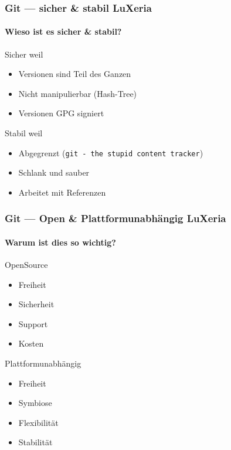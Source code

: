 \begin{frame}
	\frametitle{Git --- sicher \& stabil \hfill{} LuXeria}
	\framesubtitle{Wieso ist es sicher \& stabil?}
	\begin{block}{Sicher weil}
		\begin{itemize}
			\item Versionen sind Teil des Ganzen
			\item Nicht manipulierbar (Hash-Tree)
			\item Versionen GPG signiert
		\end{itemize}
	\end{block}
	\begin{block}{Stabil weil}
		\begin{itemize}
			\item Abgegrenzt (\lstinline$git - the stupid content tracker$)
			\item Schlank und sauber
			\item Arbeitet mit Referenzen
		\end{itemize}
	\end{block}
\end{frame}

\begin{frame}
	\frametitle{Git --- Open \& Plattformunabhängig \hfill{} LuXeria}
	\framesubtitle{Warum ist dies so wichtig?}
	\begin{block}{OpenSource}
		\begin{itemize}
			\item Freiheit
			\item Sicherheit
			\item Support
			\item Kosten
		\end{itemize}
	\end{block}
	\begin{block}{Plattformunabhängig}
		\begin{itemize}
			\item Freiheit
			\item Symbiose
			\item Flexibilität
			\item Stabilität
		\end{itemize}
	\end{block}
\end{frame}

